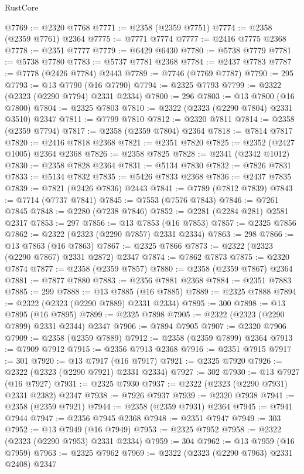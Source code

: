 \begin{lexlean}{RustCore}
\begin{coremodule}
@7769 := @2320 @7768
@7771 := @2358 (@2359 @7751)
@7774 := @2358 (@2359 @7761) @2364
@7775 := @7771 @7774
@7777 := @2416 @7775 @2368
@7778 := @2351 @7777
@7779 := @6429 @6430
@7780 := @5738 @7779
@7781 := @5738 @7780
@7783 := @5737 @7781 @2368
@7784 := @2437 @7783
@7787 := @7778 (@2426 @7784) @2443
@7789 := @7746 (@7769 @7787)
@7790 := 295
@7793 := @13 @7790 (@16 @7790)
@7794 := @2325 @7793
@7799 := @2322 (@2323 (@2290 @7794) @2331 @2334)
@7800 := 296
@7803 := @13 @7800 (@16 @7800)
@7804 := @2325 @7803
@7810 := @2322 (@2323 (@2290 @7804) @2331 @3510) @2347
@7811 := @7799 @7810
@7812 := @2320 @7811
@7814 := @2358 (@2359 @7794)
@7817 := @2358 (@2359 @7804) @2364
@7818 := @7814 @7817
@7820 := @2416 @7818 @2368
@7821 := @2351 @7820
@7825 := @2352 (@2427 @1005) @2364 @2368
@7826 := @2358 @7825
@7828 := @2341 (@2342 @1012)
@7830 := @2358 @7828 @2364
@7831 := @5134 @7830
@7832 := @7826 @7831
@7833 := @5134 @7832
@7835 := @5426 @7833 @2368
@7836 := @2437 @7835
@7839 := @7821 (@2426 @7836) @2443
@7841 := @7789 (@7812 @7839)
@7843 := @7714 (@7737 @7841)
@7845 := @7553 (@7576 @7843)
@7846 := @7261 @7845
@7848 := @2280 (@7238 @7846)
@7852 := @2281 (@2284 @281) @2581 @2317
@7853 := 297
@7856 := @13 @7853 (@16 @7853)
@7857 := @2325 @7856
@7862 := @2322 (@2323 (@2290 @7857) @2331 @2334)
@7863 := 298
@7866 := @13 @7863 (@16 @7863)
@7867 := @2325 @7866
@7873 := @2322 (@2323 (@2290 @7867) @2331 @2872) @2347
@7874 := @7862 @7873
@7875 := @2320 @7874
@7877 := @2358 (@2359 @7857)
@7880 := @2358 (@2359 @7867) @2364
@7881 := @7877 @7880
@7883 := @2356 @7881 @2368
@7884 := @2351 @7883
@7885 := 299
@7888 := @13 @7885 (@16 @7885)
@7889 := @2325 @7888
@7894 := @2322 (@2323 (@2290 @7889) @2331 @2334)
@7895 := 300
@7898 := @13 @7895 (@16 @7895)
@7899 := @2325 @7898
@7905 := @2322 (@2323 (@2290 @7899) @2331 @2344) @2347
@7906 := @7894 @7905
@7907 := @2320 @7906
@7909 := @2358 (@2359 @7889)
@7912 := @2358 (@2359 @7899) @2364
@7913 := @7909 @7912
@7915 := @2356 @7913 @2368
@7916 := @2351 @7915
@7917 := 301
@7920 := @13 @7917 (@16 @7917)
@7921 := @2325 @7920
@7926 := @2322 (@2323 (@2290 @7921) @2331 @2334)
@7927 := 302
@7930 := @13 @7927 (@16 @7927)
@7931 := @2325 @7930
@7937 := @2322 (@2323 (@2290 @7931) @2331 @2382) @2347
@7938 := @7926 @7937
@7939 := @2320 @7938
@7941 := @2358 (@2359 @7921)
@7944 := @2358 (@2359 @7931) @2364
@7945 := @7941 @7944
@7947 := @2356 @7945 @2368
@7948 := @2351 @7947
@7949 := 303
@7952 := @13 @7949 (@16 @7949)
@7953 := @2325 @7952
@7958 := @2322 (@2323 (@2290 @7953) @2331 @2334)
@7959 := 304
@7962 := @13 @7959 (@16 @7959)
@7963 := @2325 @7962
@7969 := @2322 (@2323 (@2290 @7963) @2331 @2408) @2347

\end{coremodule}
\end{lexlean}
